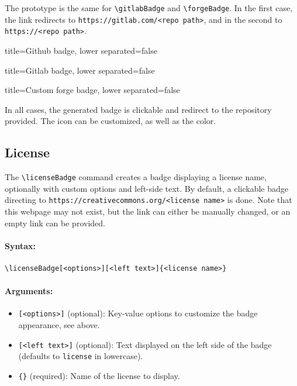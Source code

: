 The prototype is the same for \texttt{\textbackslash gitlabBadge} and \texttt{\textbackslash forgeBadge}.
In the first case, the link redirects to \texttt{https://gitlab.com/<repo path>},
and in the second to \texttt{https://<repo path>}.


\begin{tcblisting}{title={Github badge}, lower separated=false}
\end{tcblisting}

\begin{tcblisting}{title={Gitlab badge}, lower separated=false}
\end{tcblisting}

\begin{tcblisting}{title={Custom forge badge}, lower separated=false}
\end{tcblisting}

In all cases, the generated badge is clickable and redirect to the repository provided.
The icon can be customized, as well as the color.

\subsection{License}


The \texttt{\textbackslash licenseBadge} command creates a badge displaying a license name, optionally with custom options and left-side text.
By default, a clickable badge directing to \texttt{https://creativecommons.org/<license name>} is done.
Note that this webpage may not exist, but the link can either be manually changed, or an empty link can be provided.

\paragraph{Syntax:}
\begin{verbatim}
\licenseBadge[<options>][<left text>]{<license name>}
\end{verbatim}

\paragraph{Arguments:}
\begin{itemize}
    \item \texttt{[<options>]} (optional): Key-value options to customize the badge appearance, see above.
    \item \texttt{[<left text>]} (optional): Text displayed on the left side of the badge (defaults to \texttt{license} in lowercase).
    \item \texttt{\{<license name>\}} (required): Name of the license to display.
\end{itemize}


